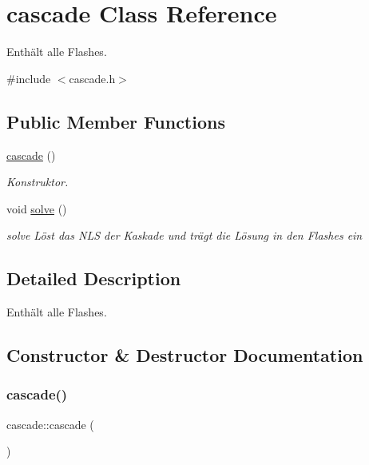 \hypertarget{classcascade}{}\section{cascade Class Reference}
\label{classcascade}


Enthält alle Flashes.  




{\ttfamily \#include $<$cascade.\+h$>$}

\subsection*{Public Member Functions}
\begin{DoxyCompactItemize}
\item 
\mbox{\hyperlink{classcascade_a0215d853ce25d724cd778ab512b0eda6}{cascade}} ()
\begin{DoxyCompactList}\small\item\em Konstruktor. \end{DoxyCompactList}\item 
void \mbox{\hyperlink{classcascade_a97774229982891611641e05bfe4d8c06}{solve}} ()
\begin{DoxyCompactList}\small\item\em solve Löst das N\+LS der Kaskade und trägt die Lösung in den Flashes ein \end{DoxyCompactList}\end{DoxyCompactItemize}


\subsection{Detailed Description}
Enthält alle Flashes. 

\subsection{Constructor \& Destructor Documentation}
\mbox{\label{classcascade_a0215d853ce25d724cd778ab512b0eda6}} 
\subsubsection{\texorpdfstring{cascade()}{cascade()}}
{\footnotesize\ttfamily cascade\+::cascade (\begin{DoxyParamCaption}{ }\end{DoxyParamCaption})\hspace{0.3cm}{\ttfamily [inline]}}



